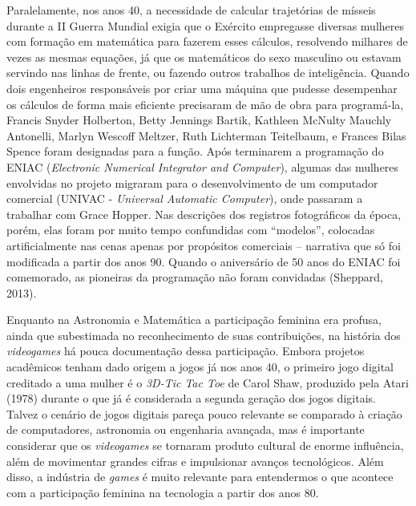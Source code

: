 Paralelamente, nos anos 40, a necessidade de calcular trajetórias de mísseis durante a II Guerra Mundial exigia que o Exército empregasse diversas mulheres com formação em matemática para fazerem esses cálculos, resolvendo milhares de vezes as mesmas equações, já que os matemáticos do sexo masculino ou estavam servindo nas linhas de frente, ou fazendo outros trabalhos de inteligência. Quando dois engenheiros responsáveis por criar uma máquina que pudesse desempenhar os cálculos de forma mais eficiente precisaram de mão de obra para programá-la, Francis Snyder Holberton, Betty Jennings Bartik, Kathleen McNulty Mauchly Antonelli, Marlyn Wescoff Meltzer, Ruth Lichterman Teitelbaum, e Frances Bilas Spence foram designadas para a função. Após terminarem a programação do ENIAC (\textit{Electronic Numerical Integrator and Computer}), algumas das mulheres envolvidas no projeto migraram para o desenvolvimento de um computador comercial (UNIVAC - \textit{Universal Automatic Computer}), onde passaram a trabalhar com Grace Hopper. Nas descrições dos registros fotográficos da época, porém, elas foram por muito tempo confundidas com “modelos”, colocadas artificialmente nas cenas apenas por propósitos comerciais – narrativa que só foi modificada a partir dos anos 90. Quando o aniversário de 50 anos do ENIAC foi comemorado, as pioneiras da programação não foram convidadas (Sheppard, 2013).

Enquanto na Astronomia e Matemática a participação feminina era profusa, ainda que subestimada no reconhecimento de suas contribuições, na história dos \textit{videogames} há pouca documentação dessa participação. Embora projetos acadêmicos tenham dado origem a jogos já nos anos 40, o primeiro jogo digital creditado a uma mulher é o \textit{3D-Tic Tac Toe} de Carol Shaw, produzido pela Atari (1978) durante o que já é considerada a segunda geração dos jogos digitais. Talvez o cenário de jogos digitais pareça pouco relevante se comparado à criação de computadores, astronomia ou engenharia avançada, mas é importante considerar que os \textit{videogames} se tornaram produto cultural de enorme influência, além de movimentar grandes cifras e impulsionar avanços tecnológicos. Além disso, a indústria de \textit{games} é muito relevante para entendermos o que acontece com a participação feminina na tecnologia a partir dos anos 80.

